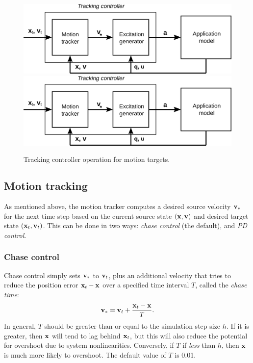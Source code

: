 \begin{figure}[ht]
\begin{center}
\iflatexml
   \includegraphics[]{images/trackingController}
\else
   \includegraphics[width=5in]{images/trackingController}
\fi
\end{center}
\caption{Tracking controller operation for motion targets.}
\label{trackingController:fig}
\end{figure}

\subsection{Motion tracking}
\label{MotionTracking:sec}

As mentioned above, the motion tracker computes a desired source velocity
${\bf v}_*$ for the next time step based on the current source state $({\bf x}, {\bf v})$ and
desired target state $({\bf x}_t, {\bf v}_t)$. This can be done in two ways: {\it
chase control} (the default), and {\it PD control}.

\subsubsection{Chase control}
\label{ChaseControl:sec}

Chase control simply sets ${\bf v}_*$ to ${\bf v}_t$, plus an additional velocity that
tries to reduce the position error ${\bf x}_t - {\bf x}$ over a specified time interval
$T$, called the {\it chase time}:
%
\begin{equation}
{\bf v}_* = {\bf v}_t + \frac{{\bf x}_t - {\bf x}}{T}.
\label{chaseControl:eqn}
\end{equation}
%
In general, $T$ should be greater than or equal to the simulation step size
$h$. If it is greater, then ${\bf x}$ will tend to lag behind ${\bf x}_t$, but this will
also reduce the potential for overshoot due to system
nonlinearities. Conversely, if $T$ if {\it less} than $h$, then ${\bf x}$ is much
more likely to overshoot.  The default value of $T$ is 0.01.

